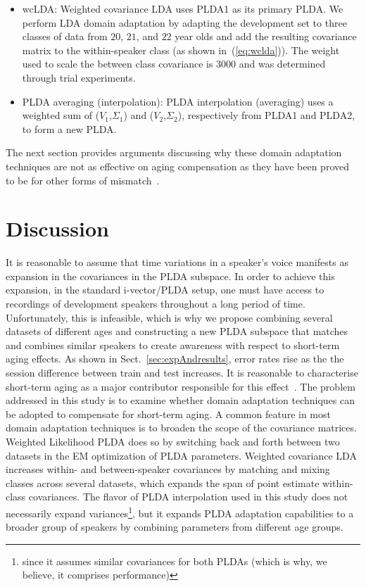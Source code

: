 \documentclass[a4paper]{article}
\begin{document}
\begin{itemize}
\item{wcLDA: Weighted covariance LDA uses PLDA1 as its primary PLDA. We perform LDA domain adaptation by adapting the development set to three classes of data from $20$, $21$, and $22$ year olds and add the resulting covariance matrix to the within-speaker class (as shown in~(\ref{eq:wclda})). The weight used to scale the between class covariance is $3000$ and was determined through trial experiments. }
\end{itemize}


\begin{itemize}
\item{PLDA averaging (interpolation): PLDA interpolation (averaging) uses a weighted sum of ($V_1$,$\Sigma_1$) and ($V_2$,$\Sigma_2$), respectively from PLDA1 and PLDA2, to form a new PLDA.}
\end{itemize}

The next section provides arguments discussing why these domain adaptation techniques are not as effective on aging compensation as they have been proved to be for other forms of mismatch~\cite{garcia2014supervised}. 


\section{Discussion}
\label{sec:discussion}
It is reasonable to assume that time variations in a speaker's voice manifests as expansion in the covariances in the PLDA subspace. In order to achieve this expansion, in the standard i-vector/PLDA setup, one must have access to recordings of development speakers throughout a long period of time. Unfortunately, this is infeasible, which is why we propose combining several datasets of different ages and constructing a new PLDA subspace that matches and combines similar speakers to create awareness with respect to short-term aging effects. As shown in Sect.~\ref{sec:expAndresults}, error rates rise as the the session difference between train and test increases. It is reasonable to characterise short-term aging as a major contributor responsible for this effect~\cite{kellyinterspeech15}. The problem addressed in this study is to examine whether domain adaptation techniques can be adopted to compensate for short-term aging. A common feature in most domain adaptation techniques is to broaden the scope of the covariance matrices. Weighted Likelihood PLDA does so by switching back and forth between two datasets in the EM optimization of PLDA parameters. Weighted covariance LDA increases within- and between-speaker covariances by matching and mixing classes across several datasets, which expands the span of point estimate within-class covariances. The flavor of PLDA interpolation used in this study does not necessarily expand variances\footnote{since it assumes similar covariances for both PLDAs (which is why, we believe, it comprises performance)}, but it expands PLDA adaptation capabilities to a broader group of speakers by combining parameters from different age groups. 
\end{document}
